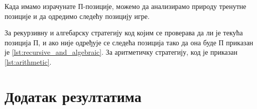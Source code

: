 \documentclass[a4paper]{article}
\begin{document}
Када имамо израчунате П-позиције, можемо да анализирамо природу тренутне позиције и да одредимо следећу позицију игре.

За рекурзивну и алгебарску стратегију код којим се проверава да ли је текућа позиција П, и ако није одређује се следећа позиција тако да она буде П приказан је \ref{lst:recursive_and_algebraic}.
За аритметичку стратегију, код је приказан \ref{lst:arithmetic}.





\newpage
\appendix
\section{Додатак резултатима}



\newpage
{}
\appendix
 

\end{document}
